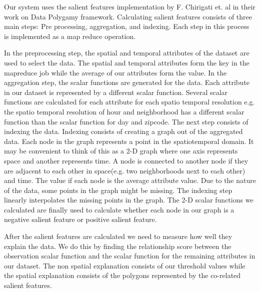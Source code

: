Our system uses the salient features implementation by F. Chirigati et. al in their work on Data Polygamy framework. Calculating salient features consists of three main steps: Pre processing, aggregation, and indexing. Each step in this process is implemented as a map reduce operation. 

In the preprocessing step, the spatial and temporal attributes of the dataset are used to select the data. The spatial and temporal attributes form the key in the mapreduce job while the average of our attributes form the value. In the aggregation step, the scalar functions are generated for the data. Each attribute in our dataset is represented by a different scalar function. Several scalar functions are calculated for each attribute for each spatio temporal resolution e.g. the spatio temporal resolution of hour and neighborhood has a different scalar function than the scalar function for day and zipcode. The next step consists of indexing the data. Indexing consists of creating a graph out of the aggregated data. Each node in the graph represents a point in the spatiotemporal domain. It may be convenient to think of this as a 2-D graph where one axis represents space and another represents time. A node is connected to another node if they are adjacent to each other in space(e.g. two neighborhoods next to each other) and time. The value if each node is the average attribute value. Due to the nature of the data, some points in the graph might be missing. The indexing step linearly interpolates the missing points in the graph. The 2-D scalar functions we calculated are finally used to calculate whether each node in our graph is a negative salient feature or positive salient feature.

After the salient features are calculated we need to measure how well they explain the data. We do this by finding the relationship score between the observation scalar function and the scalar function for the remaining attributes in our dataset. The non spatial explanation consists of our threshold values while the spatial explanation consists of the polygons represented by the co-related salient features.
